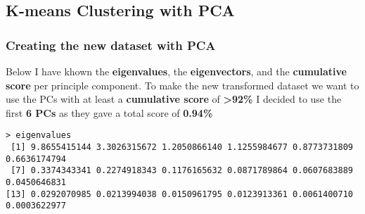 \documentclass[11pt]{article}
\begin{document}
\subsection{K-means Clustering with PCA}
\subsubsection{Creating the new dataset with PCA}
Below I have khown the \textbf{eigenvalues}, the \textbf{eigenvectors}, and the \textbf{cumulative score} per principle component. 
To make the new transformed dataset we want to use the PCs with at least a \textbf{cumulative score} of \textbf{\textgreater 92\%}
I decided to use the first \textbf{6 PCs} as they gave a total score of \textbf{0.94\%}
\begin{lstlisting}
> eigenvalues
 [1] 9.8655415144 3.3026315672 1.2050866140 1.1255984677 0.8773731809 0.6636174794
 [7] 0.3374343341 0.2274918343 0.1176165632 0.0871789864 0.0607683889 0.0450646831
[13] 0.0292070985 0.0213994038 0.0150961795 0.0123913361 0.0061400710 0.0003622977


\end{lstlisting}
\end{document}
